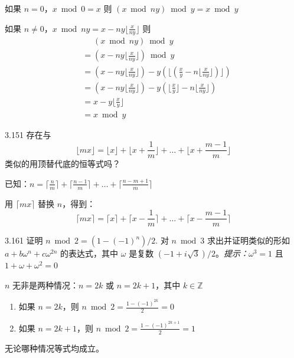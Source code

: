 如果 \( n = 0 \)，\( x \bmod 0 = x \)
则 \( (x \bmod ny) \bmod y = x \bmod y \)

如果 \( n \neq 0 \)，\( x \bmod ny = x - ny \lfloor \frac{x}{ny} \rfloor \)
则
\begin{align*}
  &\phantom{=} (x \bmod ny) \bmod y \\
  &= (x - ny \lfloor \frac{x}{ny} \rfloor) \bmod y \\
  &= (x - ny \lfloor \frac{x}{ny} \rfloor) - y (\lfloor (\frac{x}{y} - n \lfloor \frac{x}{ny} \rfloor) \rfloor) \\
  &= (x - ny \lfloor \frac{x}{ny} \rfloor) - y (\lfloor \frac{x}{y} \rfloor -n \lfloor \frac{x}{ny} \rfloor) \\
  &= x - y \lfloor \frac{x}{y} \rfloor \\
  &= x \bmod y
\end{align*}

\begin{problem}{3.15}{1}
  存在与
  \[
    \lfloor mx \rfloor = \lfloor x \rfloor + \lfloor x + \frac{1}{m} \rfloor + \dots + \lfloor x + \frac{m-1}{m} \rfloor
  \]
  类似的用顶替代底的恒等式吗？
\end{problem}

已知：\( n = \lceil \frac{n}{m} \rceil + \lceil \frac{n-1}{m} \rceil + \dots + \lceil \frac{n-m+1}{m} \rceil \)

用 \( \lceil mx \rceil \) 替换 \( n \)，得到：
\[
  \lceil mx \rceil = \lceil x \rceil + \lceil x - \frac{1}{m} \rceil + \dots + \lceil x - \frac{m-1}{m} \rceil
\]

\begin{problem}{3.16}{1}
  证明 \( n \bmod 2 = (1 - (-1)^n )/2. \) 对 \( n \bmod 3 \) 求出并证明类似的形如 \( a + b \omega^n + c \omega^{2n} \) 的表达式，其中 \( \omega \) 是复数 \( (-1 + i \sqrt{3} ) / 2 \)。\textit{提示：}\( \omega^3 = 1 \) 且 \( 1 + \omega + \omega^2 = 0 \)
\end{problem}

\( n \) 无非是两种情况：\( n = 2k \) 或 \( n = 2k+1 \)，其中 \( k \in \mathbb{Z} \)
\begin{enumerate}
  \item 如果 \( n = 2k \)，则 \( n \bmod 2 = \frac{1-(-1)^{2k}}{2} = 0 \)
  \item 如果 \( n = 2k+1 \)，则 \( n \bmod 2 = \frac{1-(-1)^{2k+1}}{2} = 1 \)
\end{enumerate}
无论哪种情况等式均成立。

